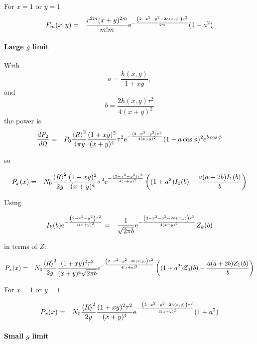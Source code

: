 \documentclass[11pt]{article}
\newcommand{\der}[2]{\frac{d {#1}}{d {#2}}}
\newcommand{\e}{{\rm e}}
\begin{document}
{{{{For $x=1$ or $y=1$
\begin{eqnarray}
F_{m}(x,y)&=&\frac{r^{2m}(x+y)^{2m}}{m!m}\e^{-\frac{\left(2-x^{2}-y^{2}-2h(x,y)\right)s^{2}}{4m}}(1+a^{2})
\end{eqnarray}



\paragraph{Large $g$ limit}

With
$$a=\frac{h(x,y)}{1+xy},$$
and
$$b=\frac{2h(x,y)\tau^{2}}{4(x+y)^{2}}$$
the power is
\begin{eqnarray}\der{P_{2}}{\Omega}
&=&P_{0}\frac{\left<R\right>^{2}}{4\pi y}\frac{(1+xy)^{2}}{(x+y)^{4}}\tau^{2}\e^{-\frac{(2-x^{2}-y^{2})\tau^{2}}{4(x+y)^{2}}}(1-a\cos\phi)^{2}\e^{b\cos\phi}\end{eqnarray}

so

\begin{eqnarray}
P_{x}(x)&=&N_{0}\frac{\left<R\right>^{2}}{2y}\frac{(1+xy)^{2}}{(x+y)^{4}}\tau^{2}\e^{-\frac{(2-x^{2}-y^{2})\tau^{2}}{4(x+y)^{2}}}\left((1+a^{2})I_{0}(b)-\frac{a(a+2b)I_{1}(b)}{b}\right)
\end{eqnarray}

Using

\begin{eqnarray}
I_{k}(b)\e^{-\frac{\left(2-x^{2}-y^{2}\right)\tau^{2}}{4(x+y)^{2}}}&=&\frac{1}{\sqrt{2\pi b}}\e^{-\frac{\left(2-x^{2}-y^{2}-2h(x,y)\right)\tau^{2}}{4(x+y)^{2}}}Z_{k}(b)
\end{eqnarray}

in terms of $Z$:

\begin{eqnarray}
P_{x}(x)&=&N_{0}\frac{\left<R\right>^{2}}{2y}\frac{(1+xy)^{2}\tau^{2}}{(x+y)^{4}\sqrt{2\pi b}}\e^{-\frac{\left(2-x^{2}-y^{2}-2h(x,y)\right)\tau^{2}}{4(x+y)^{2}}}\left((1+a^{2})Z_{0}(b)-\frac{a(a+2b)Z_{1}(b)}{b}\right)
\end{eqnarray}

For $x=1$ or $y=1$

\begin{eqnarray}
P_{x}(x)&=&N_{0}\frac{\left<R\right>^{2}}{2y}\frac{(1+xy)^{2}\tau^{2}}{(x+y)^{4}}\e^{-\frac{\left(2-x^{2}-y^{2}-2h(x,y)\right)\tau^{2}}{4(x+y)^{2}}}(1+a^{2})
\end{eqnarray}

\paragraph{Small $g$ limit}

}}}}
\end{document}
